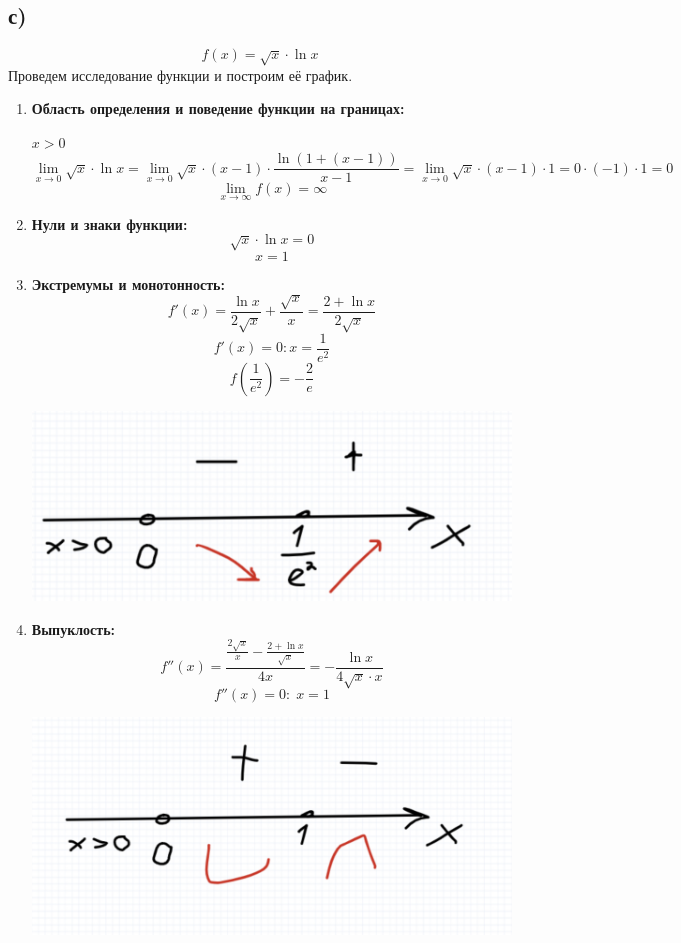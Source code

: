 \documentclass[a4paper,12pt]{article}
\begin{document}
\subsection*{с)}
\[
f(x) = \sqrt{x} \cdot \ln x
\]
Проведем исследование функции и построим её график.
\begin{enumerate}
\item \textbf{Область определения и поведение функции на границах:}

$ x > 0$
\[
\lim_{x \rightarrow 0} \sqrt{x} \cdot \ln x =\lim_{x \rightarrow 0} \sqrt{x} \cdot (x-1) \cdot \frac{\ln (1 + (x-1))}{x-1} = \lim_{x \rightarrow 0} \sqrt{x} \cdot (x-1) \cdot 1 = 0 \cdot (-1) \cdot 1 = 0
\]
\[
\lim_{x \rightarrow \infty} f(x) = \infty
\]
\item \textbf{Нули и знаки функции:}
\[
\sqrt{x} \cdot \ln x = 0
\]
\[
x = 1
\]
\item \textbf{Экстремумы и монотонность:}
\[
f'(x) = \frac{\ln x}{2 \sqrt{x}} + \frac{\sqrt{x}}{x} = \frac{2 + \ln x}{2 \sqrt{x}}
\]
\[
f'(x) = 0 : x = \frac{1}{e^2}
\]
\[
f(\frac{1}{e^2}) = -\frac{2}{e}
\]
\begin{center}
\includegraphics[scale=0.3]{5.png}
\end{center}
\item \textbf{Выпуклость:}
\[
f''(x) = \frac{\frac{2\sqrt{x}}{x} - \frac{2 + \ln x}{\sqrt{x}}}{4x} =  - \frac{\ln x}{4\sqrt{x} \cdot x}
\]
\[
f''(x) = 0 : \; x = 1
\]
\begin{center}
\includegraphics[scale=0.3]{6.png}

\end{center}
\end{enumerate}
\end{document}
